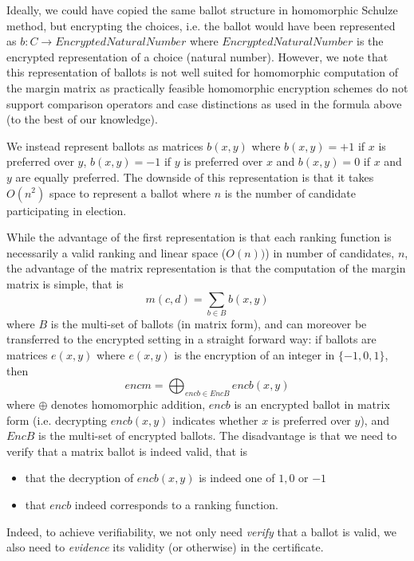 Ideally, we could have copied the same ballot structure in homomorphic Schulze method, 
but encrypting the choices, i.e. the ballot would have been represented as $b: C \to EncryptedNaturalNumber$
where $EncryptedNaturalNumber$ is the encrypted representation of a choice (natural number).
However, we note that this representation of ballots is not well suited for
homomorphic computation of the margin matrix as practically feasible
homomorphic encryption schemes do not support comparison operators
and case distinctions as used in the formula above (to the best of our knowledge).

We instead represent ballots as matrices
$b(x, y)$ where $b(x, y) = +1$ if $x$ is preferred
over $y$, $b(x, y) = -1$ if $y$ is preferred over $x$ and $b(x, y) =
0$ if $x$ and $y$ are equally preferred. The downside of this representation 
is that it takes $O(n^2)$ space to represent a ballot where $n$ is the number 
of candidate participating in election. 

While the advantage of the first representation is that each ranking
function is necessarily a valid ranking and linear space ($O(n))$) in number 
of candidates, $n$, the advantage of the matrix 
representation is that the computation of
the margin matrix is simple, that is
\[ m(c, d) = \sum_{b \in B} b(x, y) \]
where $B$ is the multi-set of ballots (in matrix form), and can
moreover be transferred to the encrypted setting in a straight
forward way: if ballots are matrices $e(x,y)$ where $e(x,y)$ is the
encryption of an integer in $\lbrace -1, 0, 1 \rbrace$, then
\begin{equation}\label{eqn:enc-mm}
encm = \bigoplus_{encb \in EncB} encb(x, y) 
\end{equation}
where $\oplus$ denotes homomorphic addition, $encb$ is an encrypted
ballot in matrix form (i.e. decrypting $encb(x, y)$ indicates
whether $x$ is preferred over $y$), and $EncB$ is the multi-set of
encrypted ballots. The disadvantage is that we need to verify that a
matrix ballot is indeed valid, that is
\begin{itemize}
\item that the decryption of $encb(x, y)$ is indeed one of $1, 0$ or
$-1$
\item that $encb$ indeed corresponds to a ranking function.
\end{itemize}

\noindent
Indeed, to achieve verifiability, we not only need \emph{verify}
that a ballot is valid, we also need to \emph{evidence} its validity
(or otherwise) in the certificate.  

